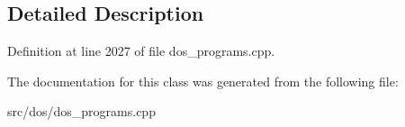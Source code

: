 \subsection{Detailed Description}


Definition at line 2027 of file dos\-\_\-programs.\-cpp.



The documentation for this class was generated from the following file\-:\begin{DoxyCompactItemize}
\item 
src/dos/dos\-\_\-programs.\-cpp\end{DoxyCompactItemize}
